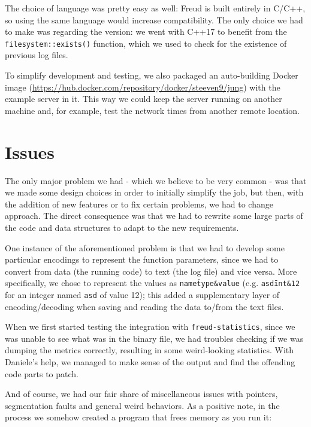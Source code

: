         The choice of language was pretty easy as well: Freud is built entirely in C/C++, so using the same
        language would increase compatibility. The only choice we had to make was regarding the version:
        we went with C++17 to benefit from the \texttt{filesystem::exists()} function, which we used to check
        for the existence of previous log files.

        To simplify development and testing, we also packaged an auto-building Docker image 
        (\url{https://hub.docker.com/repository/docker/steeven9/jung}) with the example server in it.
        This way we could keep the server running on another machine and, for example, test the network times
        from another remote location.


    \section{Issues}\label{sec:issues}

        The only major problem we had - which we believe to be very common - was that we made some
        design choices in order to initially simplify the job, but then, with the addition of
        new features or to fix certain problems, we had to change approach. The direct consequence was that we
        had to rewrite some large parts of the code and data structures to adapt to the new requirements.
        
        One instance of the aforementioned problem is that we had to develop some particular encodings
        to represent the function parameters, since we had to convert from data (the running code) to text
        (the log file) and vice versa. More specifically, we chose to represent the values as 
        \texttt{name\=type\&value} (e.g. \texttt{asd\=int\&12} for an integer named \texttt{asd} of value 12);
        this added a supplementary layer of encoding/decoding when saving and reading the data to/from the
        text files.

        When we first started testing the integration with \texttt{freud-statistics}, since we was unable
        to see what was in the binary file, we had troubles checking if we was dumping the metrics correctly,
        resulting in some weird-looking statistics. With Daniele's help, we managed to make sense of
        the output and find the offending code parts to patch.

        And of course, we had our fair share of miscellaneous issues with pointers, segmentation faults and 
        general weird behaviors. As a positive note, in the process we somehow created a program that frees
        memory as you run it:

